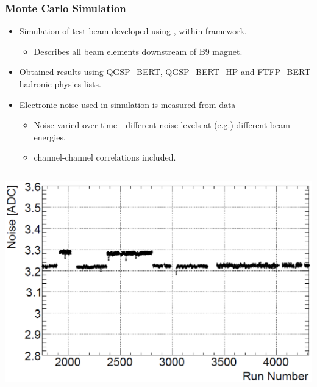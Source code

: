 \documentclass[10pt]{beamer}
\begin{document}
\begin{frame}\frametitle{Monte Carlo Simulation}
\begin{itemize}
\item Simulation of test beam developed using \geant, within \athena framework.
\begin{itemize}
\item Describes all beam elements downstream of B9 magnet.
\end{itemize}
\item Obtained results using QGSP\_BERT, QGSP\_BERT\_HP and FTFP\_BERT hadronic physics lists.
\item Electronic noise used in simulation is measured from data 
\begin{itemize}
\item Noise varied over time - different noise levels at (e.g.) different beam energies.
\item channel-channel correlations included.
\end{itemize}
\end{itemize}
\begin{columns}
\includegraphics[width=1.0\linewidth,angle=0]{TBoverview/noise_v_run.eps}
\end{columns}
\end{frame}
\end{document}
